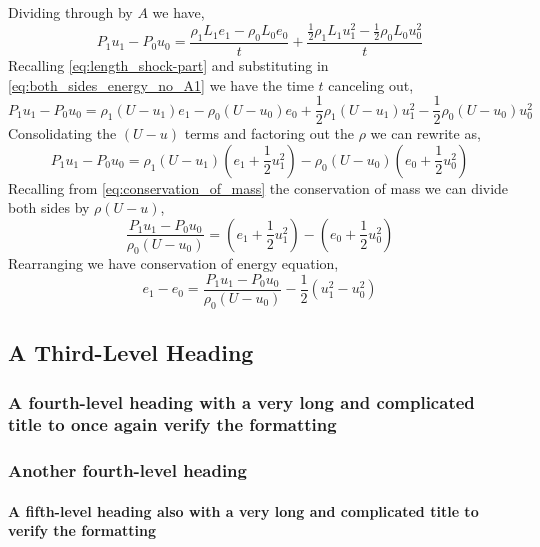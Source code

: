 Dividing through by $A$ we have,
\begin{equation} \label{eq:both_sides_energy_no_A1}
P_1u_1 - P_0u_0 = \frac{\rho_1 L_1e_1 - \rho_0 L_0e_0}{t} + \frac{\frac{1}{2}\rho_1 L_1u_1^2 - \frac{1}{2}\rho_0 L_0u_0^2}{t}
\end{equation}
Recalling \ref{eq:length_shock-part} and substituting in \ref{eq:both_sides_energy_no_A1} we have the time $t$ canceling out,
\begin{equation} \label{eq:both_sides_energy_no_A2}
P_1u_1 - P_0u_0 = \rho_1 (U-u_1)e_1 - \rho_0 (U-u_0)e_0 + \frac{1}{2}\rho_1 (U-u_1)u_1^2 - \frac{1}{2}\rho_0 (U-u_0)u_0^2
\end{equation}
Consolidating the $(U-u)$ terms and factoring out the $\rho$ we can rewrite as,
\begin{equation} \label{eq:both_sides_energy_no_A3}
P_1u_1 - P_0u_0 = \rho_1 (U-u_1)\left(e_1 + \frac{1}{2} u_1^2\right) - \rho_0 (U-u_0)\left(e_0 + \frac{1}{2} u_0^2\right)
\end{equation}
Recalling from \ref{eq:conservation_of_mass} the conservation of mass we can divide both sides by $\rho(U-u)$,
\begin{equation} \label{eq:both_sides_energy_no_A4}
\frac{P_1u_1 - P_0u_0}{\rho_0 (U-u_0)} = \left(e_1 + \frac{1}{2} u_1^2\right) - \left(e_0 + \frac{1}{2} u_0^2\right)
\end{equation}
Rearranging we have conservation of energy equation,
\begin{equation} \label{eq:both_sides_energy_no_A5}
e_1-e_0 = \frac{P_1u_1 - P_0u_0}{\rho_0 (U-u_0)} - \frac{1}{2}(u_1^2-u_0^2)
\end{equation}


\subsection{A Third-Level Heading}
\lipsum[10]
\subsubsection{A fourth-level heading with a very long and complicated title
to once again verify the formatting}
\lipsum[10-12]
\subsubsection{Another fourth-level heading}
\lipsum[10-12]
\paragraph{A fifth-level heading also with a very long and complicated
  title to verify the formatting}
\lipsum[20]
